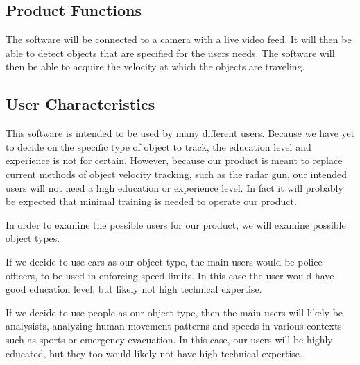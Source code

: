 \documentclass[onecolumn, draftclsnofoot,10pt, compsoc]{IEEEtran}
\begin{document}
\subsection{Product Functions}
The software will be connected to a camera with a live video feed.
It will then be able to detect objects that are specified for the users needs.
The software will then be able to acquire the velocity at which the objects are traveling.


\subsection{User Characteristics}



This software is intended to be used by many different users. 
Because we have yet to decide on the specific type of object to track, the education level and experience is not for certain. 
However, because our product is meant to replace current methods of object velocity tracking, such as the radar gun, our intended users will not need a high education or experience level. 
In fact it will probably be expected that minimal training is needed to operate our product.

In order to examine the possible users for our product, we will examine possible object types.

If we decide to use cars as our object type, the main users would be police officers, to be used in enforcing speed limits. 
In this case the user would have good education level, but likely not high technical expertise.

If we decide to use people as our object type, then the main users will likely be analysists, analyzing human movement patterns and speeds in various contexts such as sports or emergency evacuation. In this case, our users will be highly educated, but they too would likely not have high technical expertise.
\end{document}
